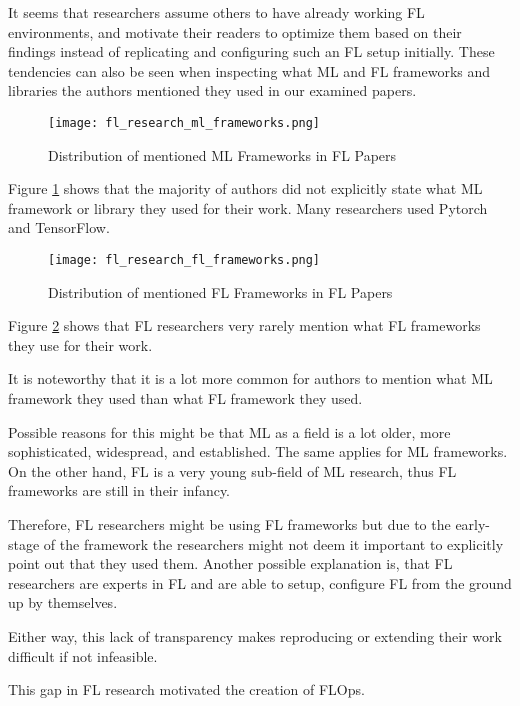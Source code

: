 It seems that researchers assume others to have already working FL environments,
and motivate their readers to optimize them based on their findings
instead of replicating and configuring such an FL setup initially.
These tendencies can also be seen when inspecting what ML and FL frameworks and libraries
the authors mentioned they used in our examined papers.

\begin{figure}[H]
    \centering
    \texttt{[image: fl\_research\_ml\_frameworks.png]}
    \caption{Distribution of mentioned ML Frameworks in FL Papers}
    \label{fig:fl_research_ml_frameworks}
\end{figure}

Figure \ref{fig:fl_research_ml_frameworks} shows that the majority of authors
did not explicitly state what ML framework or library they used for their work.
Many researchers used Pytorch and TensorFlow.

\begin{figure}[H]
    \centering
    \texttt{[image: fl\_research\_fl\_frameworks.png]}
    \caption{Distribution of mentioned FL Frameworks in FL Papers}
    \label{fig:fl_research_fl_frameworks}
\end{figure}

Figure \ref{fig:fl_research_fl_frameworks} shows that FL researchers
very rarely mention what FL frameworks they use for their work.

It is noteworthy that it is a lot more common for authors to mention what ML 
framework they used than what FL framework they used.

Possible reasons for this might be that ML as a field is a lot older, more sophisticated,
widespread, and established.
The same applies for ML frameworks.
On the other hand, FL is a very young sub-field of ML research,
thus FL frameworks are still in their infancy.

Therefore, FL researchers might be using FL frameworks but due to the early-stage 
of the framework the researchers might not deem it important to explicitly point out that they used them.
Another possible explanation is, that FL researchers are experts in FL and
are able to setup, configure FL from the ground up by themselves.

Either way, this lack of transparency makes reproducing or extending
their work difficult if not infeasible.

This gap in FL research motivated the creation of FLOps.